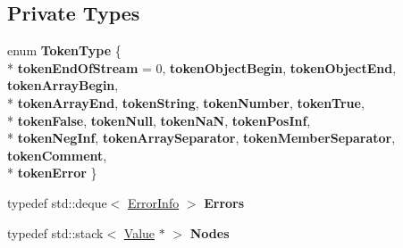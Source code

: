 \subsection*{Private Types}
\begin{DoxyCompactItemize}
\item 
\hypertarget{class_json_1_1_our_reader_a15116f7276ddf1e7a2cc3cbefa884dcc}{}enum {\bfseries Token\+Type} \{ \\*
{\bfseries token\+End\+Of\+Stream} = 0, 
{\bfseries token\+Object\+Begin}, 
{\bfseries token\+Object\+End}, 
{\bfseries token\+Array\+Begin}, 
\\*
{\bfseries token\+Array\+End}, 
{\bfseries token\+String}, 
{\bfseries token\+Number}, 
{\bfseries token\+True}, 
\\*
{\bfseries token\+False}, 
{\bfseries token\+Null}, 
{\bfseries token\+Na\+N}, 
{\bfseries token\+Pos\+Inf}, 
\\*
{\bfseries token\+Neg\+Inf}, 
{\bfseries token\+Array\+Separator}, 
{\bfseries token\+Member\+Separator}, 
{\bfseries token\+Comment}, 
\\*
{\bfseries token\+Error}
 \}\label{class_json_1_1_our_reader_a15116f7276ddf1e7a2cc3cbefa884dcc}

\item 
\hypertarget{class_json_1_1_our_reader_a8cc69593ef7303e58e99bb5dbb767562}{}typedef std\+::deque$<$ \hyperlink{class_json_1_1_our_reader_1_1_error_info}{Error\+Info} $>$ {\bfseries Errors}\label{class_json_1_1_our_reader_a8cc69593ef7303e58e99bb5dbb767562}

\item 
\hypertarget{class_json_1_1_our_reader_a8480a5ef159cee3a090f96358414d8d3}{}typedef std\+::stack$<$ \hyperlink{class_json_1_1_value}{Value} $\ast$ $>$ {\bfseries Nodes}\label{class_json_1_1_our_reader_a8480a5ef159cee3a090f96358414d8d3}

\end{DoxyCompactItemize}
